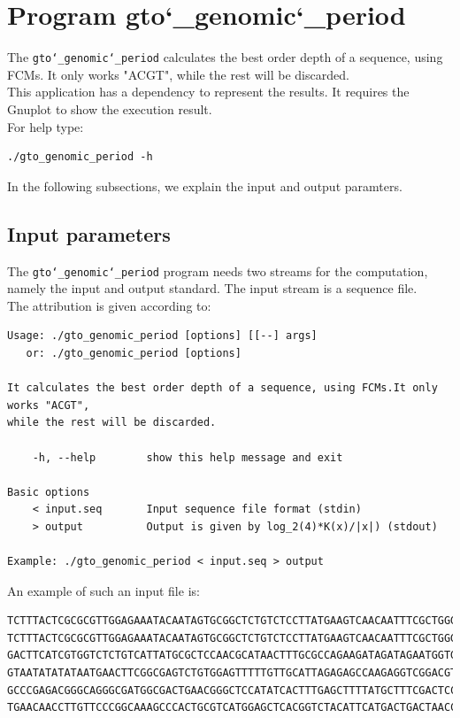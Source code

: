 \section{Program gto\char`_genomic\char`_period}
The \texttt{gto\char`_genomic\char`_period} calculates the best order depth of a sequence, using FCMs. It only works "ACGT", while the rest will be discarded.\\
This application has a dependency to represent the results. It requires the Gnuplot to show the execution result.\\
For help type:
\begin{lstlisting}
./gto_genomic_period -h
\end{lstlisting}
In the following subsections, we explain the input and output paramters.

\subsection*{Input parameters}

The \texttt{gto\char`_genomic\char`_period} program needs two streams for the computation, namely the input and output standard. The input stream is a sequence file.\\
The attribution is given according to:
\begin{lstlisting}
Usage: ./gto_genomic_period [options] [[--] args]
   or: ./gto_genomic_period [options]

It calculates the best order depth of a sequence, using FCMs.It only works "ACGT", 
while the rest will be discarded.

    -h, --help        show this help message and exit

Basic options
    < input.seq       Input sequence file format (stdin)
    > output          Output is given by log_2(4)*K(x)/|x|) (stdout)

Example: ./gto_genomic_period < input.seq > output
\end{lstlisting}
An example of such an input file is:
\begin{lstlisting}
TCTTTACTCGCGCGTTGGAGAAATACAATAGTGCGGCTCTGTCTCCTTATGAAGTCAACAATTTCGCTGGGACTTGCGGC
TCTTTACTCGCGCGTTGGAGAAATACAATAGTGCGGCTCTGTCTCCTTATGAAGTCAACAATTTCGCTGGGACTTGCGGC
GACTTCATCGTGGTCTCTGTCATTATGCGCTCCAACGCATAACTTTGCGCCAGAAGATAGATAGAATGGTGTAAGAAACT
GTAATATATATAATGAACTTCGGCGAGTCTGTGGAGTTTTTGTTGCATTAGAGAGCCAAGAGGTCGGACGTCCTCACGTA
GCCCGAGACGGGCAGGGCGATGGCGACTGAACGGGCTCCATATCACTTTGAGCTTTTATGCTTTCGACTCCTCCAGGAGC
TGAACAACCTTGTTCCCGGCAAAGCCCACTGCGTCATGGAGCTCACGGTCTACATTCATGACTGACTAACCGTAAACTGC
\end{lstlisting}

